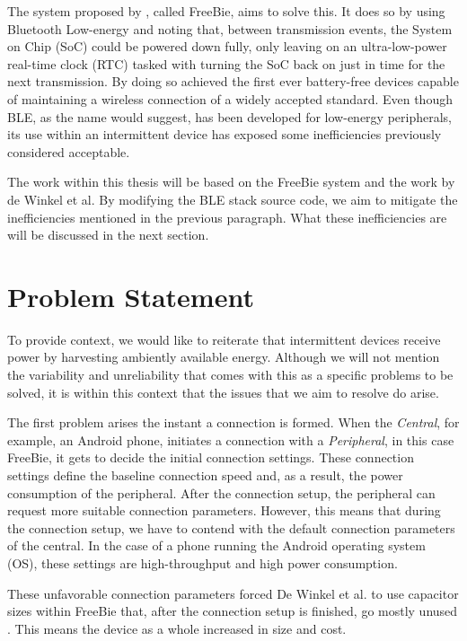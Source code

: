 The system proposed by \cite{freebie}, called FreeBie, aims to solve this. It does so by using Bluetooth Low-energy and noting that, between transmission events, the System on Chip (SoC) could be powered down fully, only leaving on an ultra-low-power real-time clock (RTC) tasked with turning the SoC back on just in time for the next transmission. By doing so \cite{freebie} achieved the first ever battery-free devices capable of maintaining a wireless connection of a widely accepted standard. Even though BLE, as the name would suggest, has been developed for low-energy peripherals, its use within an intermittent device has exposed some inefficiencies previously considered acceptable.

The work within this thesis will be based on the FreeBie system and the work by de Winkel et al. By modifying the BLE stack source code, we aim to mitigate the inefficiencies mentioned in the previous paragraph. What these inefficiencies are will be discussed in the next section.

\section*{Problem Statement}
\label{sec:introduction_problem_statement}

To provide context, we would like to reiterate that intermittent devices receive power by harvesting ambiently available energy. Although we will not mention the variability and unreliability that comes with this as a specific problems to be solved, it is within this context that the issues that we aim to resolve do arise.

The first problem arises the instant a connection is formed. When the \textit{Central}, for example, an Android phone, initiates a connection with a \textit{Peripheral}, in this case FreeBie, it gets to decide the initial connection settings. These connection settings define the baseline connection speed and, as a result, the power consumption of the peripheral. After the connection setup, the peripheral can request more suitable connection parameters. However, this means that during the connection setup, we have to contend with the default connection parameters of the central. In the case of a phone running the Android operating system (OS), these settings are high-throughput and high power consumption. 

These unfavorable connection parameters forced De Winkel et al. to use capacitor sizes within FreeBie that, after the connection setup is finished, go mostly unused \cite{freebie}. This means the device as a whole increased in size and cost. 

